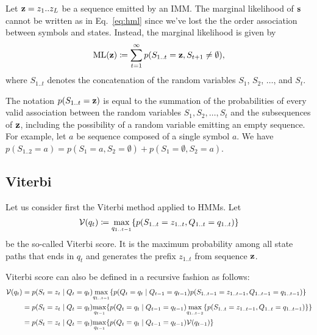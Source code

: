 Let $\mathbf{z}=z_1 .. z_L$ be a sequence emitted by an IMM.\@
The marginal likelihood of $\mathbf{s}$ cannot be written as in Eq.~\eqref{eq:hml} since
we've lost the the order association between symbols and states.
Instead, the marginal likelihood is given by
\begin{equation}\label{eq:ml}
  \mathrm{ML}(\mathbf{z}) \coloneqq \sum_{t=1}^{\infty} p(S_{1..t}=\mathbf{z}, S_{t+1}\neq \emptyset),
\end{equation}
where $S_{1..t}$ denotes the concatenation of the random variables $S_1$, $S_2$,
$\dots$, and $S_t$.

\begin{remark}
  The notation $p(S_{1..t}=\mathbf{z})$ is equal to the summation of the probabilities of every valid
  association between the random variables $S_1, S_2, \dots, S_t$ and the subsequences of $\mathbf{z}$,
  including the possibility of a random variable emitting an empty sequence. For example, let $a$ be
  sequence composed of a single symbol $a$. We have $p(S_{1..2}=a) = p(S_1=a, S_2=\emptyset) +
  p(S_1=\emptyset, S_2=a)$.
\end{remark}

\subsection{Viterbi}

Let us consider first the Viterbi method applied to HMMs.
Let
\begin{equation*}
  \mathcal{V}(q_t) \coloneqq \underset{q_{1..t-1}}{\max} \{ p(S_{1..t}=z_{1..t}, Q_{1..t}=q_{1..t}) \}
\end{equation*}
be the so-called Viterbi score. It is the maximum probability among all state paths that ends in
$q_t$ and generates the prefix $z_{1..t}$ from sequence $\mathbf{z}$.

Viterbi score can also be defined in a recursive fashion as follows:
\begin{equation*}
\begin{split}
  \mathcal{V}(q_t)
  &= p(S_t=z_t \;|\; Q_t=q_t) \underset{q_{1..t-1}}{\max}
    \{ p(Q_t=q_t \;|\; Q_{t-1}=q_{t-1}) p(S_{1..t-1}=z_{1..t-1}, Q_{1..t-1}=q_{1..t-1}) \} \\
  &= p(S_t=z_t \;|\; Q_t=q_t) \underset{q_{t-1}}{\max}
    \{ p(Q_t=q_t \;|\; Q_{t-1}=q_{t-1})
    \underset{q_{1..t-2}}{\max} \{ p(S_{1..t}=z_{1..t-1}, Q_{1..t}=q_{1..t-1}) \} \} \\
  &= p(S_t=z_t \;|\; Q_t=q_t) \underset{q_{t-1}}{\max} \{ p(Q_t=q_t \;|\; Q_{t-1}=q_{t-1})
    \mathcal{V}(q_{t-1}) \}
\end{split}
\end{equation*}

